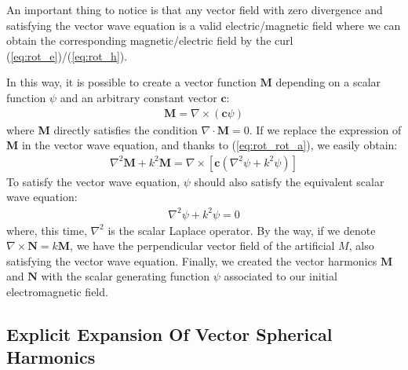 \documentclass{article}
\numberwithin{equation}{section}
\begin{document}
An important thing to notice is that any vector field with zero divergence and satisfying the vector wave equation is a valid electric/magnetic field where we can obtain the corresponding magnetic/electric field by the curl (\ref{eq:rot_e})/(\ref{eq:rot_h}).

In this way, it is possible to create a vector function $\textbf{M}$ depending on a scalar function $\psi$ and an arbitrary constant vector $\textbf{c}$:
\begin{align}
\textbf{M} = \nabla \times (\textbf{c}\psi)
\end{align}
where \textbf{M} directly satisfies the condition $\nabla \cdot \textbf{M} = 0$. If we replace the expression of \textbf{M} in the vector wave equation, and thanks to (\ref{eq:rot_rot_a}), we easily obtain:
\begin{align}
\nabla ^{2} \textbf{M} + k^{2}\textbf{M} = \nabla \times [\textbf{c}(\nabla ^{2} \psi + k^{2}\psi)]
\end{align}
To satisfy the vector wave equation, $\psi$ should also satisfy the equivalent scalar wave equation:
\begin{align}\label{eq:psi_wave_eq}
\nabla ^{2} \psi + k^{2}\psi = 0
\end{align}
where, this time, $\nabla ^{2}$ is the scalar Laplace operator. By the way, if we denote $\nabla \times \textbf{N} = k \textbf{M}$, we have the perpendicular vector field of the artificial $M$, also satisfying the vector wave equation. Finally, we created the vector harmonics $\textbf{M}$ and $\textbf{N}$ with the scalar generating function $\psi$ associated to our initial electromagnetic field.

\subsection{Explicit Expansion Of Vector Spherical Harmonics}
\end{document}
